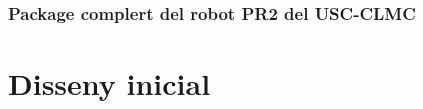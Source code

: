 \documentclass[12pt,a4paper,final,twoside]{article}
\begin{document}
\subsubsection{Package complert del robot PR2 del USC-CLMC}

\newpage
\section{Disseny inicial}
\end{document}
